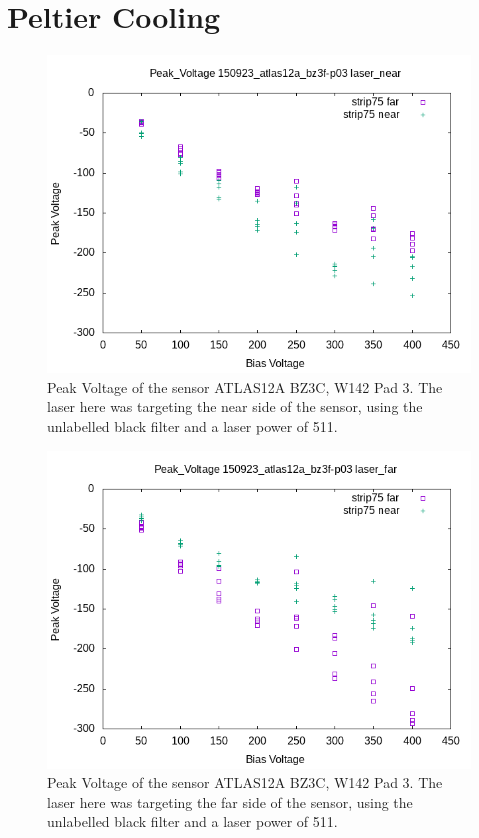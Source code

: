 \documentclass{report}
\begin{document}
            

        \section{Peltier Cooling}
            \begin{figure}[h] 
                \includegraphics[height=.4\textheight]{Peak_Voltage__150923_atlas12a_bz3f-p03__laser_near}
                \centering
                \caption{ Peak Voltage of the sensor ATLAS12A BZ3C, W142 Pad 3. The laser here was targeting the near side of the sensor, using the unlabelled black filter and a laser power of 511. }
                \label{fig:Peak_Voltage__150923_atlas12a_bz3f-p03__laser_near}
            \end{figure}

            \begin{figure}[h] 
                \includegraphics[height=.4\textheight]{Peak_Voltage__150923_atlas12a_bz3f-p03__laser_far}
                \centering
                \caption{ Peak Voltage of the sensor ATLAS12A BZ3C, W142 Pad 3. The laser here was targeting the far side of the sensor, using the unlabelled black filter and a laser power of 511. }
                \label{fig:Peak_Voltage__150923_atlas12a_bz3f-p03__laser_far}
            \end{figure}
\end{document}
